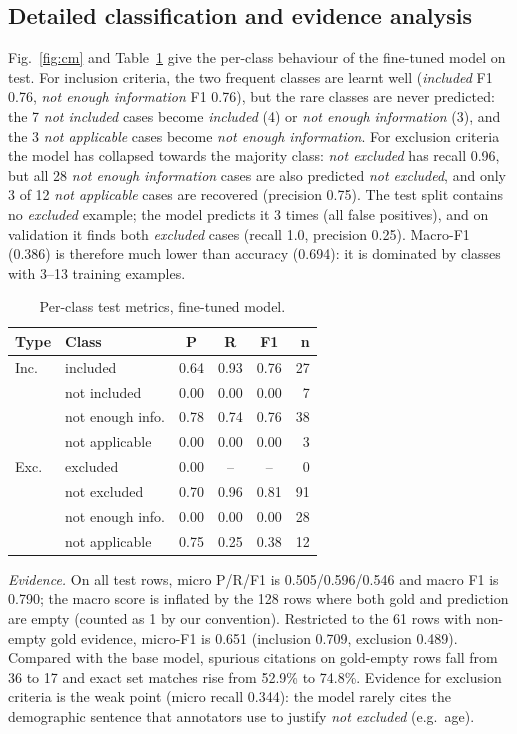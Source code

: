 \documentclass[conference]{IEEEtran}
\begin{document}
\subsection{Detailed classification and evidence analysis}
Fig.~\ref{fig:cm} and Table~\ref{tab:perclass} give the per-class behaviour of the fine-tuned model on test. For inclusion criteria, the two frequent classes are learnt well (\emph{included} F1 0.76, \emph{not enough information} F1 0.76), but the rare classes are never predicted: the 7 \emph{not included} cases become \emph{included} (4) or \emph{not enough information} (3), and the 3 \emph{not applicable} cases become \emph{not enough information}. For exclusion criteria the model has collapsed towards the majority class: \emph{not excluded} has recall 0.96, but all 28 \emph{not enough information} cases are also predicted \emph{not excluded}, and only 3 of 12 \emph{not applicable} cases are recovered (precision 0.75). The test split contains no \emph{excluded} example; the model predicts it 3 times (all false positives), and on validation it finds both \emph{excluded} cases (recall 1.0, precision 0.25). Macro-F1 (0.386) is therefore much lower than accuracy (0.694): it is dominated by classes with 3--13 training examples.

\begin{table}[t]\centering\caption{Per-class test metrics, fine-tuned model.}\label{tab:perclass}\setlength{\tabcolsep}{4pt}
\begin{tabular}{llcccr}\toprule
Type & Class & P & R & F1 & n\\\midrule
Inc. & included & 0.64 & 0.93 & 0.76 & 27\\
 & not included & 0.00 & 0.00 & 0.00 & 7\\
 & not enough info. & 0.78 & 0.74 & 0.76 & 38\\
 & not applicable & 0.00 & 0.00 & 0.00 & 3\\\midrule
Exc. & excluded & 0.00 & -- & -- & 0\\
 & not excluded & 0.70 & 0.96 & 0.81 & 91\\
 & not enough info. & 0.00 & 0.00 & 0.00 & 28\\
 & not applicable & 0.75 & 0.25 & 0.38 & 12\\\bottomrule
\end{tabular}\end{table}

\emph{Evidence.} On all test rows, micro P/R/F1 is 0.505/0.596/0.546 and macro F1 is 0.790; the macro score is inflated by the 128 rows where both gold and prediction are empty (counted as 1 by our convention). Restricted to the 61 rows with non-empty gold evidence, micro-F1 is 0.651 (inclusion 0.709, exclusion 0.489). Compared with the base model, spurious citations on gold-empty rows fall from 36 to 17 and exact set matches rise from 52.9\% to 74.8\%. Evidence for exclusion criteria is the weak point (micro recall 0.344): the model rarely cites the demographic sentence that annotators use to justify \emph{not excluded} (e.g.\ age).
\end{document}
